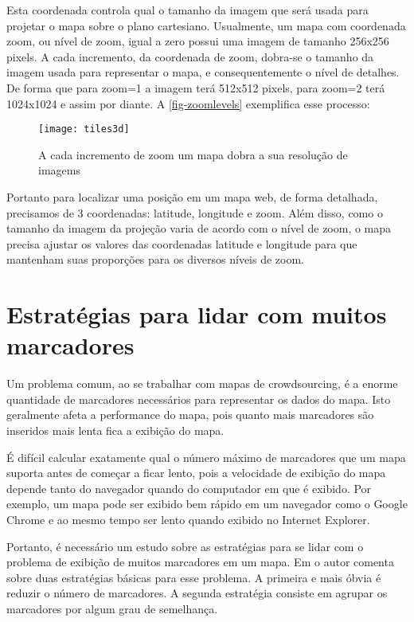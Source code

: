 	 Esta  coordenada controla qual o tamanho da imagem que será usada para projetar o mapa sobre o plano cartesiano. Usualmente, um mapa com coordenada zoom, ou nível de zoom, igual a zero possui uma imagem de tamanho 256x256 pixels. A cada incremento, da coordenada de zoom, dobra-se o tamanho da imagem usada para representar o mapa, e consequentemente o nível de detalhes. De forma que  para zoom=1 a imagem terá 512x512 pixels, para zoom=2 terá 1024x1024 e assim por diante. A \autoref{fig-zoomlevels} exemplifica esse processo:
	\begin{figure}[htb]
	\caption{\label{fig-zoomlevels} A cada incremento de zoom um mapa dobra a sua resolução de imagems}
	\begin{center}
	    \texttt{[image: tiles3d]}
	\end{center}
	\end{figure}

	Portanto para localizar uma posição  em um mapa web, de forma detalhada, precisamos de 3 coordenadas: latitude, longitude e zoom. Além disso, como o tamanho da imagem da projeção varia de acordo com o nível de zoom, o mapa precisa ajustar os valores das coordenadas latitude e longitude para que mantenham suas proporções para os diversos níveis de zoom.

\section{Estratégias para lidar com muitos marcadores}
	Um problema comum, ao se trabalhar com mapas de crowdsourcing, é a enorme quantidade de marcadores necessários para representar os dados do mapa. Isto geralmente afeta a performance do mapa, pois quanto mais marcadores são inseridos mais lenta fica a exibição do mapa. 
	
	É difícil calcular exatamente qual o número máximo de marcadores que um mapa suporta antes de começar a ficar lento, pois a velocidade de exibição do mapa depende tanto do navegador quando do computador em que é exibido. Por exemplo, um mapa pode ser exibido bem rápido em um navegador como o Google Chrome e ao mesmo tempo ser lento quando exibido no Internet Explorer.\cite[177]{livroGoogleApiV3}
	
    Portanto, é necessário um estudo sobre as  estratégias para se lidar com o problema de exibição de muitos marcadores em um mapa. Em \cite[capítulo~9]{livroGoogleApiV3} o autor comenta sobre duas estratégias básicas para esse problema. A primeira e mais óbvia é reduzir o número de marcadores. A segunda estratégia consiste em agrupar os marcadores por algum grau de semelhança.
    
